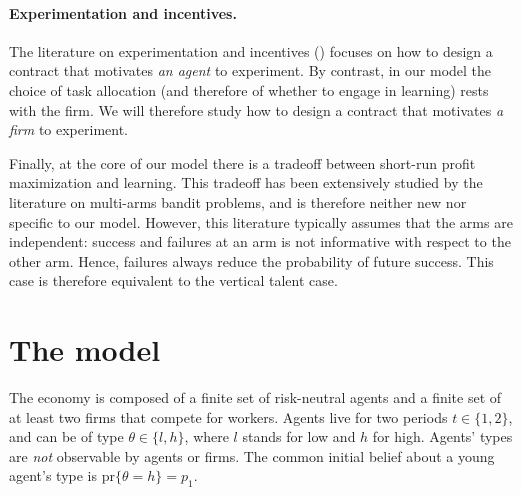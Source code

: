 \documentclass[12pt,american]{paper}
\theoremstyle{remark}
\begin{document}
\paragraph{Experimentation and incentives.} 

The literature on experimentation and incentives (\citealp*{jeitschko_information_2002, manso2011motivating,macchiavello,Gottlieb2013}) focuses on how to design a contract that motivates \textit{an agent} to experiment. %
By contrast, in our model the choice of task allocation (and therefore of whether to engage in learning) rests with the firm. We will therefore study how to design a contract that motivates \textit{a firm} to experiment.


Finally, at the core of our model there is a tradeoff between short-run profit maximization and learning. This tradeoff has been extensively studied by the literature on multi-arms bandit problems, and is therefore neither new nor  specific to our model.  However, this literature typically assumes that the arms are independent: success and failures at an arm is not informative with respect to the other arm. Hence, failures always reduce the probability of future success. This case is therefore equivalent to the vertical talent case. %



\section{The model}\label{sec:model}
The economy is composed of a finite set of risk-neutral agents and a finite set of at least two firms that compete for workers. Agents live for two periods $t\in\{1,2\}$, and can be of type $\theta\in\{l,h\}$, where $l$ stands for low and $h$ for high. Agents' types are \textit{not} observable by agents or firms. The common initial belief about a young agent's type is $\mbox{pr}\{\theta=h\}=p_1$.

\end{document}
